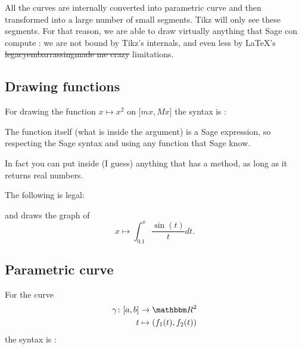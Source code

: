 All the curves are internally converted into parametric curve and then transformed into a large number of small segments. Tikz will only see these segments. For that reason, we are able to draw virtually anything that Sage con compute : we are not bound by Tikz's internals, and even less by \LaTeX's \sout{legacy}\sout{embarrassing}\sout{made me crazy} limitations.

\subsection{Drawing functions}

For drawing the function \( x\mapsto x^2\) on \( \mathopen[ mx , Mx \mathclose]\) the syntax is :



The function itself (what is inside the  argument) is a Sage expression, so respecting the Sage syntax and using any function that Sage know.

In fact you can put inside  (I guess) anything that has a  method, as long as it returns real numbers.

The following is legal:

and draws the graph of
\begin{equation}
    x\mapsto \int_{0.1}^x\frac{ \sin(t) }{ t }dt.
\end{equation}

\subsection{Parametric curve}

For the curve
\begin{equation}
    \begin{aligned}
        \gamma\colon \mathopen[ a , b \mathclose]&\to \eR^2 \\
        t&\mapsto (  f_1(t),f_2(t)  ) 
    \end{aligned}
\end{equation}
the syntax is :



